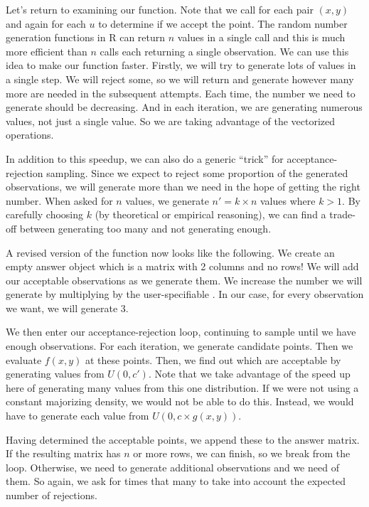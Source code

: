 Let's return to examining our function.  Note that we call
 for each pair $(x, y)$ and again for each $u$ to
determine if we accept the point.  The random number generation
functions in R can return $n$ values in a single call and this is much
more efficient than $n$ calls each returning a single observation.  We
can use this idea to make our function faster.  Firstly, we will try
to generate lots of values in a single step.  We will reject some, so
we will return and generate however many more are needed in the
subsequent attempts.  Each time, the number we need to generate should
be decreasing.  And in each iteration, we are generating numerous
values, not just a single value. So we are taking advantage of the
vectorized operations.

In addition to this speedup, we can also do a generic ``trick'' for
acceptance-rejection sampling.  Since we expect to reject some
proportion of the generated observations, we will generate more than
we need in the hope of getting the right number.  When asked for $n$
values, we generate $n' = k \times n$ values where $k > 1$.  By
carefully choosing $k$ (by theoretical or empirical reasoning), we can
find a trade-off between generating too many and not generating
enough.


A revised version of the function now looks like the following.
We create an empty answer object which is a matrix with 2 columns
and no rows! We will add our acceptable observations as we generate
them.
We increase the number we will generate by multiplying by
the user-specifiable .
In our case, for every observation we want, we will generate 3.

We then enter our acceptance-rejection loop,
continuing to sample until we have enough
observations.
For each iteration, we generate
 candidate points.
Then we evaluate $f(x, y)$ at these points.
Then, we find out which are acceptable by generating
 values from $U(0, c')$.
Note that we take advantage of the speed up here
of generating many values from this one distribution.
If we were not using a constant majorizing density, we
would not be able to do this. Instead, we would have
to generate each value from $U(0, c \times g(x, y))$.

Having determined the acceptable points, we append these to the answer
matrix. If the resulting matrix has $n$ or more rows, we can finish,
so we break from the loop.  Otherwise, we need to generate additional
observations and we need  of them.  So
again, we ask for  times that many to take into account
the expected number of rejections.

